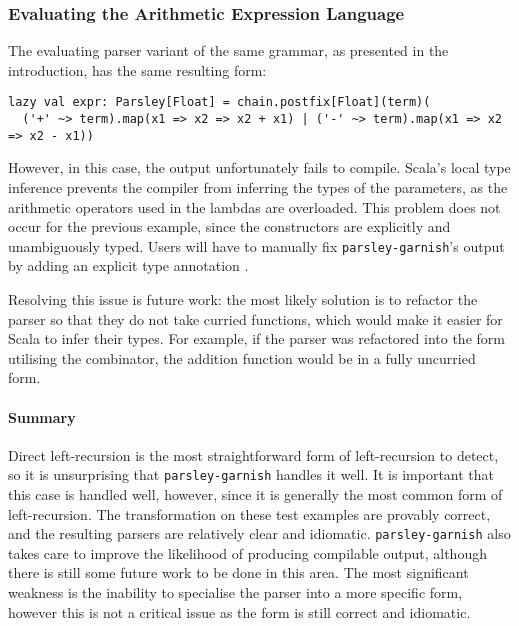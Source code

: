 \documentclass[../../main.tex]{subfiles}
\begin{document}
\subsubsection{Evaluating the Arithmetic Expression Language}
The evaluating parser variant of the same grammar, as presented in the introduction, has the same resulting form:
\begin{verbatim}
lazy val expr: Parsley[Float] = chain.postfix[Float](term)(
  ('+' ~> term).map(x1 => x2 => x2 + x1) | ('-' ~> term).map(x1 => x2 => x2 - x1))
\end{verbatim}
%
However, in this case, the output unfortunately fails to compile.
Scala's local type inference prevents the compiler from inferring the types of the  parameters, as the arithmetic operators used in the lambdas are overloaded.
This problem does not occur for the previous example, since the  constructors are explicitly and unambiguously typed.
Users will have to manually fix \texttt{parsley-garnish}'s output by adding an explicit type annotation .

Resolving this issue is future work: the most likely solution is to refactor the parser so that they do not take curried functions, which would make it easier for Scala to infer their types.
For example, if the parser was refactored into the  form utilising the  combinator, the addition function \scala{_ + _} would be in a fully uncurried form.

\paragraph{Summary}
Direct left-recursion is the most straightforward form of left-recursion to detect, so it is unsurprising that \texttt{parsley-garnish} handles it well.
It is important that this case is handled well, however, since it is generally the most common form of left-recursion.
The transformation on these test examples are provably correct, and the resulting parsers are relatively clear and idiomatic.
\texttt{parsley-garnish} also takes care to improve the likelihood of producing compilable output, although there is still some future work to be done in this area.
The most significant weakness is the inability to specialise the  parser into a more specific form, however this is not a critical issue as the  form is still correct and idiomatic.
\end{document}
